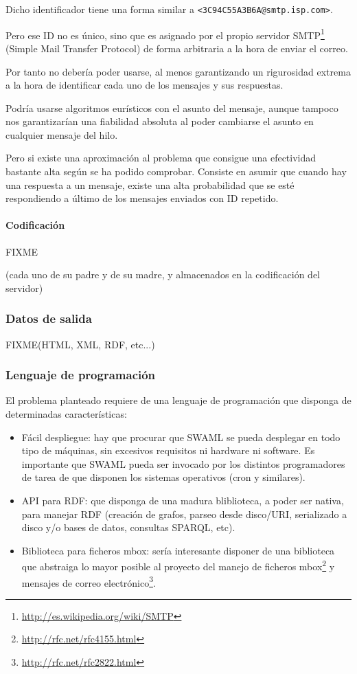 Dicho identificador tiene una forma similar a \texttt{<3C94C55A3B6A@smtp.isp.com>}.

Pero ese ID no es único, sino que es asignado por el propio servidor
SMTP\footnote{\url{http://es.wikipedia.org/wiki/SMTP}} (Simple Mail Transfer Protocol) 
de forma arbitraria a la hora de enviar el correo.

Por tanto no debería poder usarse, al menos garantizando un rigurosidad extrema
a la hora de identificar cada uno de los mensajes y sus respuestas.

Podría usarse algoritmos eurísticos con el asunto del mensaje, aunque tampoco nos
garantizarían una fiabilidad absoluta al poder cambiarse el asunto en cualquier
mensaje del hilo.

Pero si existe una aproximación al problema que consigue una efectividad bastante
alta según se ha podido comprobar. Consiste en asumir que cuando hay una respuesta
a un mensaje, existe una alta probabilidad que se esté respondiendo a último de los 
mensajes enviados con ID repetido.

\paragraph{Codificación}

FIXME

(cada uno de su padre y de su madre, y almacenados en la codificación del
servidor)

\subsubsection{Datos de salida}

FIXME(HTML, XML, RDF, etc...)

\subsubsection{Lenguaje de programación}

El problema planteado requiere de una lenguaje de programación que disponga
de determinadas características:

\begin{itemize}
  \item Fácil despliegue: hay que procurar que SWAML se pueda desplegar en
	todo tipo de máquinas, sin excesivos requisitos ni hardware ni software.
	Es importante que SWAML pueda ser invocado por los distintos programadores
	de tarea de que disponen los sistemas operativos (cron y similares).
  \item API para RDF: que disponga de una madura bliblioteca, a poder ser nativa, 
	para manejar RDF (creación de grafos, parseo desde disco/URI, serializado
	a disco y/o bases de datos, consultas SPARQL, etc).
  \item Biblioteca para ficheros mbox: sería interesante disponer de una biblioteca 
	que abstraiga lo mayor posible al proyecto del manejo de ficheros
	mbox\footnote{\url{http://rfc.net/rfc4155.html}} y mensajes de correo 
	electrónico\footnote{\url{http://rfc.net/rfc2822.html}}.
\end{itemize}

